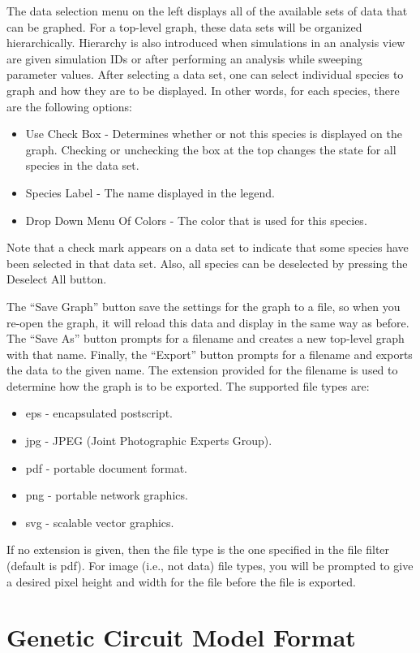 \documentclass[titlepage,11pt]{article}
\begin{document}
The data selection menu on the left displays all of the
available sets of data that can be graphed.  
For a top-level graph, these
data sets will be organized hierarchically.  Hierarchy is also 
introduced when simulations in an analysis view are given
simulation IDs or after performing an analysis while sweeping parameter
values.  After selecting a data set, one can select individual species to 
graph and how they are to be displayed.  In other words, for each 
species, there are the following options: 
\begin{itemize}
\item Use Check Box - Determines
whether or not this species is displayed on the graph.  Checking or 
unchecking the box at the top changes the state for all species in
the data set. 
\item Species Label - The name displayed in the legend. 
\item Drop Down Menu Of Colors - The color that is used for this species. 
\end{itemize}
Note that a check mark appears on a data set to indicate that some
species have been selected in that data set.  Also, all species can
be deselected by pressing the Deselect All button.

The ``Save Graph'' button save the settings for the graph to 
a file, so when you re-open the graph, it will reload this data and display 
in the same way as before.  The ``Save As'' button prompts for a 
filename and creates a new top-level graph with that name.  
Finally, the ``Export'' button prompts for a filename and exports
the data to the given name.  The extension provided for the filename 
is used to determine how the graph is to be exported. The
supported file types are: 
\begin{itemize}
\item eps - encapsulated postscript. 
\item jpg - JPEG (Joint Photographic Experts Group). 
\item pdf - portable document format.
\item png - portable network graphics. 
\item svg - scalable vector graphics.
\end{itemize}
If no extension is given, then the file type is the one
specified in the file filter (default is pdf).  For image (i.e.,
not data) file types, you will be prompted to give a desired
pixel height and width for the file before the file is exported. 

\section{\label{GCM}Genetic Circuit Model Format}
\end{document}
